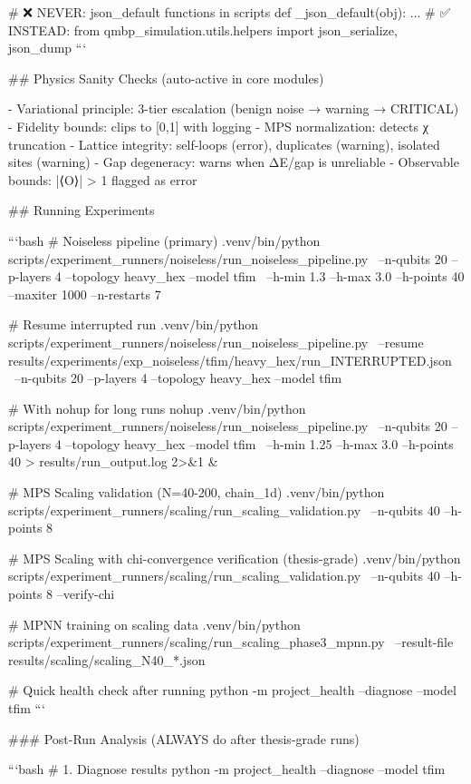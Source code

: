 # ❌ NEVER: json_default functions in scripts
def _json_default(obj): ...
# ✅ INSTEAD: from qmbp_simulation.utils.helpers import json_serialize, json_dump
```

## Physics Sanity Checks (auto-active in core modules)

- Variational principle: 3-tier escalation (benign noise → warning → CRITICAL)
- Fidelity bounds: clips to [0,1] with logging
- MPS normalization: detects χ truncation
- Lattice integrity: self-loops (error), duplicates (warning), isolated sites (warning)
- Gap degeneracy: warns when ΔE/gap is unreliable
- Observable bounds: |⟨O⟩| > 1 flagged as error

## Running Experiments

```bash
# Noiseless pipeline (primary)
.venv/bin/python scripts/experiment_runners/noiseless/run_noiseless_pipeline.py \
    --n-qubits 20 --p-layers 4 --topology heavy_hex --model tfim \
    --h-min 1.3 --h-max 3.0 --h-points 40 --maxiter 1000 --n-restarts 7

# Resume interrupted run
.venv/bin/python scripts/experiment_runners/noiseless/run_noiseless_pipeline.py \
    --resume results/experiments/exp_noiseless/tfim/heavy_hex/run_INTERRUPTED.json \
    --n-qubits 20 --p-layers 4 --topology heavy_hex --model tfim

# With nohup for long runs
nohup .venv/bin/python scripts/experiment_runners/noiseless/run_noiseless_pipeline.py \
    --n-qubits 20 --p-layers 4 --topology heavy_hex --model tfim \
    --h-min 1.25 --h-max 3.0 --h-points 40 > results/run_output.log 2>&1 &

# MPS Scaling validation (N=40-200, chain_1d)
.venv/bin/python scripts/experiment_runners/scaling/run_scaling_validation.py \
    --n-qubits 40 --h-points 8

# MPS Scaling with chi-convergence verification (thesis-grade)
.venv/bin/python scripts/experiment_runners/scaling/run_scaling_validation.py \
    --n-qubits 40 --h-points 8 --verify-chi

# MPNN training on scaling data
.venv/bin/python scripts/experiment_runners/scaling/run_scaling_phase3_mpnn.py \
    --result-file results/scaling/scaling_N40_*.json

# Quick health check after running
python -m project_health --diagnose --model tfim
```

### Post-Run Analysis (ALWAYS do after thesis-grade runs)

```bash
# 1. Diagnose results
python -m project_health --diagnose --model tfim

